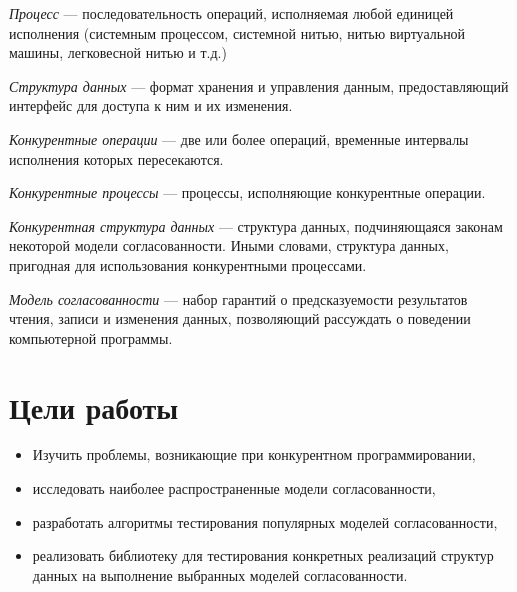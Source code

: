 \documentclass[14pt, openany]{book}
\begin{document}
\emph{Процесс} --- последовательность операций, исполняемая любой единицей исполнения (системным процессом, системной нитью, нитью виртуальной машины, легковесной нитью и т.д.)

\emph{Структура данных} --- формат хранения и управления данным, предоставляющий интерфейс для доступа к ним и их изменения.

\emph{Конкурентные операции} --- две или более операций, временные интервалы исполнения которых пересекаются.

\emph{Конкурентные процессы} --- процессы, исполняющие конкурентные операции.

\emph{Конкурентная структура данных} --- структура данных, подчиняющаяся законам некоторой модели согласованности. Иными словами, структура данных, пригодная для использования конкурентными процессами. 

\emph{Модель согласованности} --- набор гарантий о предсказуемости результатов чтения, записи и изменения данных, позволяющий рассуждать о поведении компьютерной программы.

\section{Цели работы}

\begin{itemize}
  \item Изучить проблемы, возникающие при конкурентном программировании,
  \item исследовать наиболее распространенные модели согласованности,
  \item разработать алгоритмы тестирования популярных моделей согласованности,
  \item реализовать библиотеку для тестирования конкретных реализаций структур данных на выполнение выбранных моделей согласованности.
\end{itemize}
\end{document}
